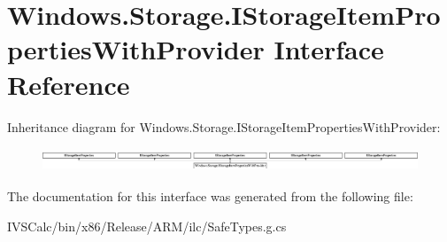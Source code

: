 \hypertarget{interface_windows_1_1_storage_1_1_i_storage_item_properties_with_provider}{}\section{Windows.\+Storage.\+I\+Storage\+Item\+Properties\+With\+Provider Interface Reference}
\label{interface_windows_1_1_storage_1_1_i_storage_item_properties_with_provider}
Inheritance diagram for Windows.\+Storage.\+I\+Storage\+Item\+Properties\+With\+Provider\+:\begin{figure}[H]
\begin{center}
\leavevmode
\includegraphics[height=0.695652cm]{interface_windows_1_1_storage_1_1_i_storage_item_properties_with_provider}
\end{center}
\end{figure}


The documentation for this interface was generated from the following file\+:\begin{DoxyCompactItemize}
\item 
I\+V\+S\+Calc/bin/x86/\+Release/\+A\+R\+M/ilc/Safe\+Types.\+g.\+cs\end{DoxyCompactItemize}
